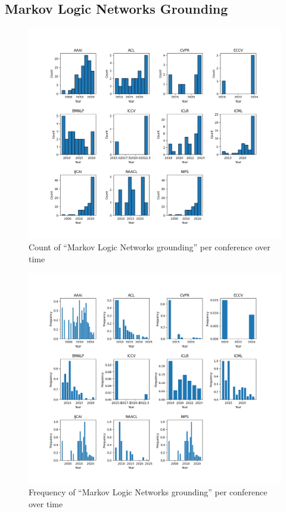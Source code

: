 \documentclass[11pt]{article}
\begin{document}
\subsection{Markov Logic Networks Grounding}
\label{sec:appendix_word_sense_years_markov}
\begin{figure}[H]
  \includegraphics[width=0.75\columnwidth]{figs/grounding_figs/Markov Logic Networks/split_by_conf_grounding_dist.png}
  \centering
  \caption{Count of ``Markov Logic Networks grounding'' per conference over time}
  \label{fig:appendix_markov_all_confs_count}
\end{figure}

\begin{figure}[H]
  \includegraphics[width=0.75\columnwidth]{figs/freq_grounding_figs/Markov Logic Networks/split_by_conf_grounding_dist.png}
  \centering
  \caption{Frequency of ``Markov Logic Networks grounding'' per conference over time}
  \label{fig:appendix_markov_all_confs_freq}
\end{figure}
\end{document}
